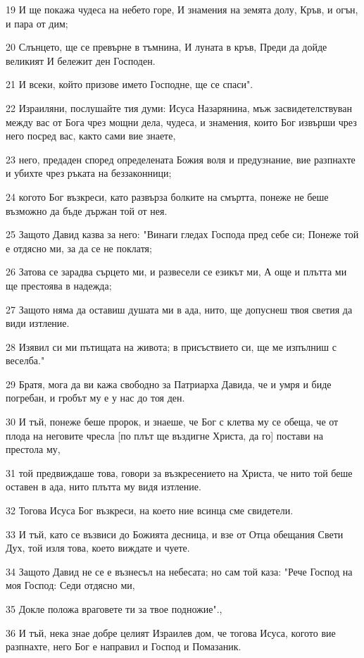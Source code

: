 \par 19 И ще покажа чудеса на небето горе, И знамения на земята долу, Кръв, и огън, и пара от дим;
\par 20 Слънцето, ще се превърне в тъмнина, И луната в кръв, Преди да дойде великият И бележит ден Господен.
\par 21 И всеки, който призове името Господне, ще се спаси".
\par 22 Израиляни, послушайте тия думи: Исуса Назарянина, мъж засвидетелствуван между вас от Бога чрез мощни дела, чудеса, и знамения, които Бог извърши чрез него посред вас, както сами вие знаете,
\par 23 него, предаден според определената Божия воля и предузнание, вие разпнахте и убихте чрез ръката на беззаконници;
\par 24 когото Бог възкреси, като развърза болките на смъртта, понеже не беше възможно да бъде държан той от нея.
\par 25 Защото Давид казва за него: "Винаги гледах Господа пред себе си; Понеже той е отдясно ми, за да се не поклатя;
\par 26 Затова се зарадва сърцето ми, и развесели се езикът ми, А още и плътта ми ще престоява в надежда;
\par 27 Защото няма да оставиш душата ми в ада, нито, ще допуснеш твоя светия да види изтление.
\par 28 Изявил си ми пътищата на живота; в присъствието си, ще ме изпълниш с веселба."
\par 29 Братя, мога да ви кажа свободно за Патриарха Давида, че и умря и биде погребан, и гробът му е у нас до тоя ден.
\par 30 И тъй, понеже беше пророк, и знаеше, че Бог с клетва му се обеща, че от плода на неговите чресла [по плът ще въздигне Христа, да го] постави на престола му,
\par 31 той предвиждаше това, говори за възкресението на Христа, че нито той беше оставен в ада, нито плътта му видя изтление.
\par 32 Тогова Исуса Бог възкреси, на което ние всинца сме свидетели.
\par 33 И тъй, като се възвиси до Божията десница, и взе от Отца обещания Свети Дух, той изля това, което виждате и чуете.
\par 34 Защото Давид не се е възнесъл на небесата; но сам той каза: "Рече Господ на моя Господ: Седи отдясно ми,
\par 35 Докле положа враговете ти за твое подножие".,
\par 36 И тъй, нека знае добре целият Израилев дом, че тогова Исуса, когото вие разпнахте, него Бог е направил и Господ и Помазаник.
